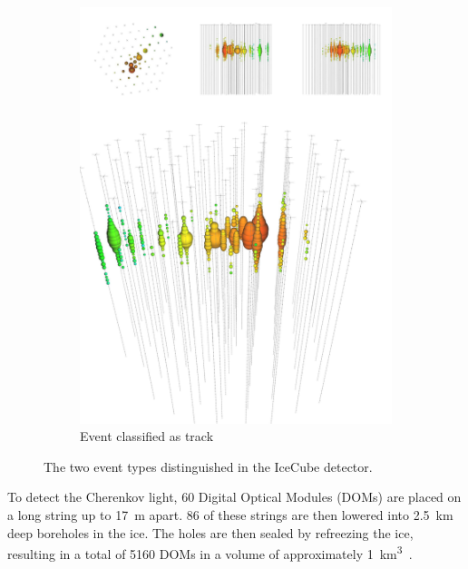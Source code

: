 \begin{figure}
\begin{center}
\begin{subfigure}{0.4\textwidth}
            \includegraphics[clip, trim=0cm 0cm 0cm 30cm, width=1\textwidth]{figures/track_event.pdf}
            \caption{Event classified as track} 
            \label{fig:events_track}
        \end{subfigure}
        \caption{The two event types distinguished in the IceCube detector.}
    \end{center}
\end{figure}

To detect the Cherenkov light, 60 Digital Optical Modules (DOMs) are placed on a long string up to \SI{17}{\metre} apart. 86 of these strings are then lowered
into \SI{2.5}{\km} deep boreholes in the ice. The holes are then sealed by refreezing the ice, resulting in a total of 5160 DOMs in a volume of approximately \SI{1}{\km^3}~\cite{weaverThesis}.

